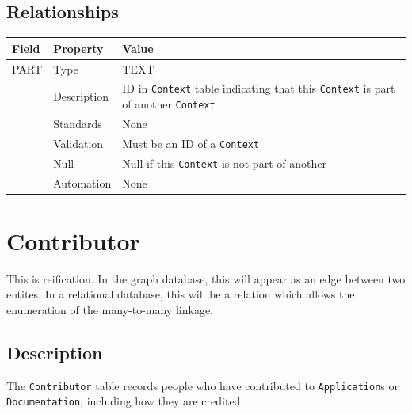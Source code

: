 \documentclass[
]{article}
\newcounter{none}
\begin{document}
\subsection{Relationships}\label{relationships-6}

{\def\LTcaptype{none} 
\begin{longtable}[]{@{}
  >{\raggedright\arraybackslash}p{}
  >{\raggedright\arraybackslash}p{}
  >{\raggedright\arraybackslash}p{}@{}}
\toprule\noalign{}
\begin{minipage}[b]{\linewidth}\raggedright
Field
\end{minipage} & \begin{minipage}[b]{\linewidth}\raggedright
Property
\end{minipage} & \begin{minipage}[b]{\linewidth}\raggedright
Value
\end{minipage} \\
\midrule\noalign{}
\endhead
\bottomrule\noalign{}
\endlastfoot
PART & Type & TEXT \\
& Description & ID in \texttt{Context} table indicating that this
\texttt{Context} is part of another \texttt{Context} \\
& Standards & None \\
& Validation & Must be an ID of a \texttt{Context} \\
& Null & Null if this \texttt{Context} is not part of another \\
& Automation & None \\
\end{longtable}
}

\section{Contributor}\label{contributor}

This is reification. In the graph database, this will appear as an edge
between two entites. In a relational database, this will be a relation
which allows the enumeration of the many-to-many linkage.

\subsection{Description}\label{description-9}

The \texttt{Contributor} table records people who have contributed to
\texttt{Application}s or \texttt{Documentation}, including how they are
credited.
\end{document}
